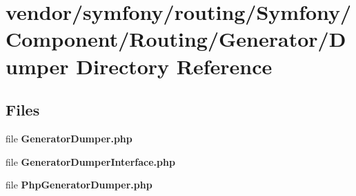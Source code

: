 \section{vendor/symfony/routing/\+Symfony/\+Component/\+Routing/\+Generator/\+Dumper Directory Reference}
\label{dir_1c85a9283254e3a57265ab6256f5ef44}
\subsection*{Files}
\begin{DoxyCompactItemize}
\item 
file {\bf Generator\+Dumper.\+php}
\item 
file {\bf Generator\+Dumper\+Interface.\+php}
\item 
file {\bf Php\+Generator\+Dumper.\+php}
\end{DoxyCompactItemize}
